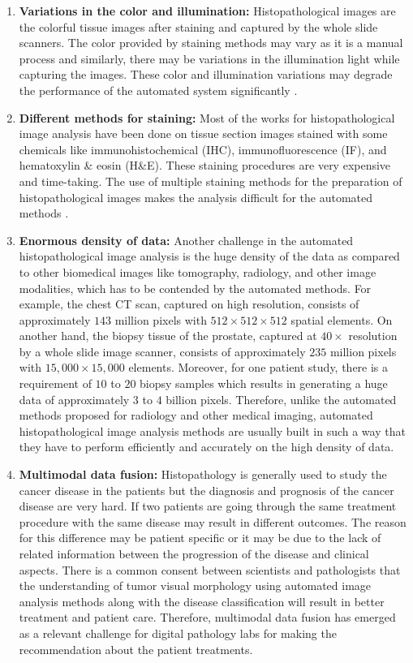 \begin{enumerate}
\item \textbf{Variations in the color and illumination:}  Histopathological images are the colorful tissue images after staining and captured by the whole slide scanners. The color provided by staining methods may vary as it is a manual process and similarly, there may be variations in the illumination light while capturing the images. These color and illumination variations may degrade the performance of the automated system significantly \cite{magee2009}.

\item \textbf{Different methods for staining:} 
Most of the works for histopathological image analysis have been done on tissue section images stained with some chemicals like immunohistochemical (IHC), immunofluorescence (IF), and hematoxylin \& eosin (H\&E). These staining procedures are very expensive and time-taking. The use of multiple staining methods for the preparation of histopathological images makes the analysis difficult for the automated methods \cite{gurcan2009} \cite{Ong1996}.

\item 
\textbf{Enormous density of data:}
Another challenge in the automated histopathological image analysis is the huge density of the data as compared to other biomedical images like tomography, radiology, and other image modalities, which has to be contended by the automated methods. For example, the chest CT scan, captured on high resolution, consists of approximately $143$ million pixels with $ 512\times512\times512$ spatial elements. On another hand, the biopsy tissue of the prostate, captured at $40\times$ resolution by a whole slide image scanner, consists of approximately $235$ million pixels with $15,000\times15,000$ elements. Moreover, for one patient study, there is a requirement of $10$ to $20$ biopsy samples which results in generating a huge data of approximately $3$ to $4$ billion pixels. Therefore, unlike the automated methods proposed for radiology and other medical imaging, automated histopathological image analysis methods are usually built in such a way that they have to perform efficiently and accurately on the high density of data.

\item \textbf{Multimodal data fusion:}
Histopathology is generally used to study the cancer disease in the patients but the diagnosis and prognosis of the cancer disease are very hard. If two patients are going through the same treatment procedure with the same disease may result in different outcomes. The reason for this difference may be patient specific or it may be due to the lack of related information between the progression of the disease and clinical aspects. There is a common consent between scientists and pathologists that the understanding of tumor visual morphology using automated image analysis methods along with the disease classification will result in better treatment and patient care. Therefore, multimodal data fusion has emerged as a relevant challenge for digital pathology labs for making the recommendation about the patient treatments. 


\end{enumerate}
